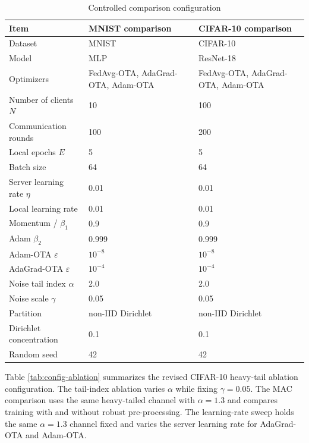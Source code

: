 \begin{table}[!htbp]
    \centering
    \caption{Controlled comparison configuration}
    \label{tab:config-main}
    \begin{tabular}{p{}|p{}|p{}}
        \hline
        Item & MNIST comparison & CIFAR-10 comparison \\
        \hline
        Dataset & MNIST & CIFAR-10 \\
        Model & MLP & ResNet-18 \\
        Optimizers & FedAvg-OTA, AdaGrad-OTA, Adam-OTA & FedAvg-OTA, AdaGrad-OTA, Adam-OTA \\
        Number of clients $N$ & 10 & 100 \\
        Communication rounds & 100 & 200 \\
        Local epochs $E$ & 5 & 5 \\
        Batch size & 64 & 64 \\
        Server learning rate $\eta$ & 0.01 & 0.01 \\
        Local learning rate & 0.01 & 0.01 \\
        Momentum / $\beta_1$ & 0.9 & 0.9 \\
        Adam $\beta_2$ & 0.999 & 0.999 \\
        Adam-OTA $\varepsilon$ & $10^{-8}$ & $10^{-8}$ \\
        AdaGrad-OTA $\varepsilon$ & $10^{-4}$ & $10^{-4}$ \\
        Noise tail index $\alpha$ & 2.0 & 2.0 \\
        Noise scale $\gamma$ & 0.05 & 0.05 \\
        Partition & non-IID Dirichlet & non-IID Dirichlet \\
        Dirichlet concentration & 0.1 & 0.1 \\
        Random seed & 42 & 42 \\
        \hline
    \end{tabular}
\end{table}

Table \ref{tab:config-ablation} summarizes the revised CIFAR-10 heavy-tail
ablation configuration. The tail-index ablation varies $\alpha$ while fixing
$\gamma=0.05$. The MAC comparison uses the same heavy-tailed channel with
$\alpha=1.3$ and compares training with and without robust pre-processing.
The learning-rate sweep holds the same $\alpha=1.3$ channel fixed and varies
the server learning rate for AdaGrad-OTA and Adam-OTA.

